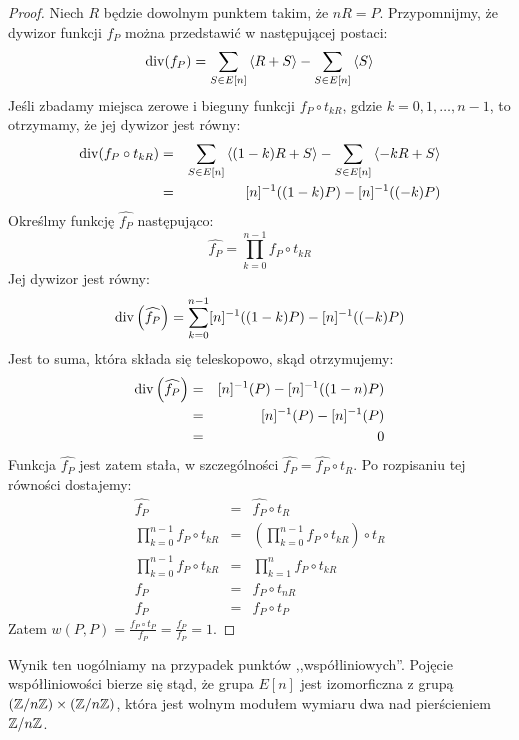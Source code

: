 \begin{proof}
Niech $R$ będzie dowolnym punktem takim, że $nR = P$.
Przypomnijmy, że dywizor funkcji $f_P$
można przedstawić w następującej postaci:
\begin{equation*}
\operatorname{div}(f_P) = \sum_{S \in E[n]} \left\langle R + S\right\rangle - \sum_{S \in E[n]} \left\langle S\right\rangle
\end{equation*}
Jeśli zbadamy miejsca zerowe i bieguny funkcji $f_P \circ t_{kR}$,
gdzie $k = 0, 1, \ldots, n-1$,
to otrzymamy, że jej dywizor jest równy:
\begin{eqnarray*}
\operatorname{div}(f_P \circ t_{kR})
& = & \sum_{S \in E[n]} \left\langle(1-k)R + S\right\rangle - \sum_{S \in E[n]} \left\langle-kR + S\right\rangle \\
& = & [n]^{-1}((1-k)P) - [n]^{-1}((-k)P)
\end{eqnarray*}
Określmy funkcję $\widehat{f_P}$ następująco:
\begin{equation*}
\widehat{f_P} = \prod_{k=0}^{n-1} f_P \circ t_{kR}
\end{equation*}
Jej dywizor jest równy:
\begin{equation*}
\operatorname{div}\left(\widehat{f_P}\right) =
\sum_{k=0}^{n-1} [n]^{-1}((1-k)P) - [n]^{-1}((-k)P)
\end{equation*}
Jest to suma, która składa się teleskopowo, skąd otrzymujemy:
\begin{eqnarray*}
\operatorname{div}\left(\widehat{f_P}\right)
& = & [n]^{-1}(P) - [n]^{-1}((1-n)P) \\
& = & [n]^{-1}(P) - [n]^{-1}(P) \\
& = & 0
\end{eqnarray*}
Funkcja $\widehat{f_P}$ jest zatem stała,
w szczególności $\widehat{f_P} = \widehat{f_P} \circ t_R$.
Po rozpisaniu tej równości dostajemy:
\begin{eqnarray*}
\widehat{f_P}
& = &
\widehat{f_P} \circ t_R
\\
\prod_{k=0}^{n-1} f_P \circ t_{kR}
& = &
\left(\prod_{k=0}^{n-1} f_P \circ t_{kR}\right) \circ t_R
\\
\prod_{k=0}^{n-1} f_P \circ t_{kR}
& = &
\prod_{k=1}^{n} f_P \circ t_{kR}
\\
f_P
& = &
f_P \circ t_{nR}
\\
f_P
& = &
f_P \circ t_P
\end{eqnarray*}
Zatem $w(P,P) = \frac{f_P \circ t_P}{f_P} = \frac{f_P}{f_P} = 1$.
\end{proof}

\noindent
Wynik ten uogólniamy na przypadek punktów ,,współliniowych''.
Pojęcie współliniowości bierze się stąd,
że grupa $E[n]$ jest izomorficzna z grupą $(\mathbb{Z}/n\mathbb{Z})\times(\mathbb{Z}/n\mathbb{Z})$,
która jest wolnym modułem wymiaru dwa nad pierścieniem $\mathbb{Z}/n\mathbb{Z}$.

